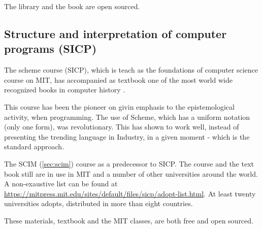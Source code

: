 \documentclass[
12pt,				%
openright,			%
oneside,			%
a4paper,			%
brazil,				%
english,			%
]{abntex2}
\begin{document}
The library and the book are open sourced.

\subsection{Structure and interpretation of computer programs (SICP)}
The scheme course (SICP), which is teach as the foundations of
computer science course on MIT, has accompanied as textbook one of the
most world wide recognized books in computer history
\cite{abelson1996structure}.

This course has been the pioneer on givin emphasis to the
epistemological activity, when programming. The use of Scheme, which
has a uniform notation (only one form), was revolutionary. This has
shown to work well, instead of presenting the trending language
in Industry, in a given moment - which is the standard approach.  

The SCIM (\autoref{sec:scim}) course as a predecessor to SICP. The course and
the text book still are in use in MIT and a number of other
universities around the world. A non-exaustive list can be found at
\url{https://mitpress.mit.edu/sites/default/files/sicp/adopt-list.html}. At
least twenty universities adopts, distributed in more than eight countries.

These materials, textbook and the MIT classes, are both free and open sourced.
\end{document}
